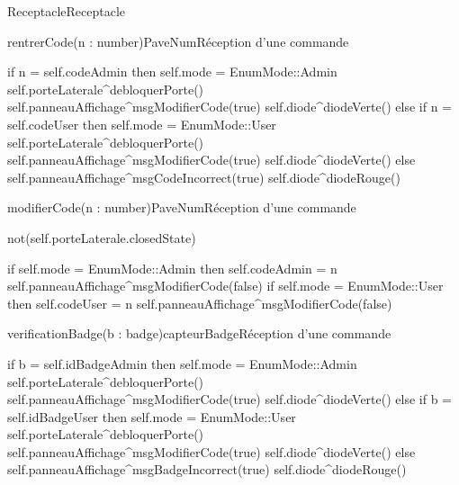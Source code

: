 \begin{OM}{Receptacle}{Receptacle}
    \begin{OMOperation}{rentrerCode(n : number)}{PaveNum}{Réception d'une commande}
        \begin{OMMessages}
        \end{OMMessages}
        \OMNoPre
        \begin{OMPost}
if n = self.codeAdmin then
    self.mode = EnumMode::Admin
    self.porteLaterale^debloquerPorte()
    self.panneauAffichage^msgModifierCode(true)
    self.diode^diodeVerte()
else if n = self.codeUser then
    self.mode = EnumMode::User
    self.porteLaterale^debloquerPorte()
    self.panneauAffichage^msgModifierCode(true)
    self.diode^diodeVerte()
else
    self.panneauAffichage^msgCodeIncorrect(true)
    self.diode^diodeRouge()
        \end{OMPost}
    \end{OMOperation}

    \begin{OMOperation}{modifierCode(n : number)}{PaveNum}{Réception d'une commande}
        \begin{OMMessages}
        \end{OMMessages}
        \begin{OMPre}
not(self.porteLaterale.closedState)
        \end{OMPre}
        \begin{OMPost}
if self.mode = EnumMode::Admin then
    self.codeAdmin = n
    self.panneauAffichage^msgModifierCode(false)
if self.mode = EnumMode::User then
    self.codeUser = n
    self.panneauAffichage^msgModifierCode(false)
        \end{OMPost}
    \end{OMOperation}

    \begin{OMOperation}{verificationBadge(b : badge)}{capteurBadge}{Réception d'une commande}
        \begin{OMMessages}
        \end{OMMessages}
        \OMNoPre
        \begin{OMPost}
if b = self.idBadgeAdmin then
    self.mode = EnumMode::Admin
    self.porteLaterale^debloquerPorte()
    self.panneauAffichage^msgModifierCode(true)
    self.diode^diodeVerte()
else if b = self.idBadgeUser then
    self.mode = EnumMode::User
    self.porteLaterale^debloquerPorte()
    self.panneauAffichage^msgModifierCode(true)
    self.diode^diodeVerte()
else
    self.panneauAffichage^msgBadgeIncorrect(true)
    self.diode^diodeRouge()
        \end{OMPost}
    \end{OMOperation}


\end{OM}
